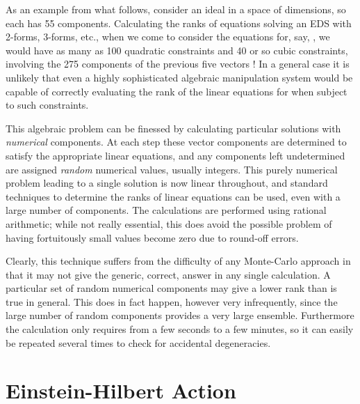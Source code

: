 \documentclass[a4paper,a4paper]{article}
\begin{document}
        As an example from what follows,  consider an ideal in a space
of \coordHE{} dimensions,  so each \coordHE{} has 55 components.  Calculating the
ranks of equations solving an EDS with  2-forms,  3-forms,  etc.,   when we come to
consider the equations for,  say,  \coordHE{},  we would have as many as
100 quadratic constraints and 40 or so cubic constraints,  involving the 275
components of the previous five vectors \coordHE{}!   In a general
case it is unlikely that even a highly sophisticated algebraic manipulation
system would be capable of correctly evaluating the rank of the linear
equations for \coordHE{} when subject to such constraints.

  This algebraic problem can be finessed by calculating particular
solutions with {\itshape numerical  }components.  At each step these
vector components are determined to satisfy the appropriate linear equations,  and any
components left undetermined are assigned {\itshape random} numerical
values, usually integers.  This purely numerical problem leading to a single
solution is now linear throughout,  and standard techniques to determine
the ranks of linear equations can be used,  even with a large number of
components.  The calculations are performed using rational arithmetic;
while not really essential,  this does avoid the possible problem of having
fortuitously small values become zero due to round-off errors.

        Clearly,  this technique suffers from the difficulty of any
Monte-Carlo approach in that it may not give the generic,  correct,
answer in any single calculation.  A particular set of random numerical components may  give
a lower rank than is true in general. This does in fact happen,
however very infrequently,  since the large number of random components
provides a very large ensemble.  Furthermore the calculation only
requires from a few seconds to a few minutes,  so it can easily be repeated
several times to check for accidental degeneracies.

\section{Einstein-Hilbert Action}
\end{document}

